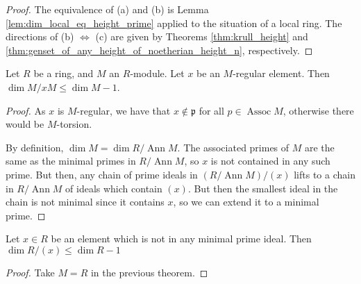 \begin{proof}
    The equivalence of (a) and (b) is
    Lemma \ref{lem:dim_local_eq_height_prime}
    applied to the situation of a local ring.
    The directions of (b) \(\iff\) (c) are given
    by Theorems \ref{thm:krull_height} and
    \ref{thm:genset_of_any_height_of_noetherian_height_n},
    respectively.
\end{proof}


%

\newcommand{\Assoc}{\operatorname{Assoc}}
\newcommand{\Ann}{\operatorname{Ann}}

\begin{theorem}
    \label{thm:quotient_regular_sub_dim_1}
    Let \(R\) be a ring, and \(M\) an \(R\)-module.
    Let \(x\) be an \(M\)-regular element.
    Then \(\dim M / xM \leq \dim M - 1\).
\end{theorem}

\begin{proof}
    As \(x\) is \(M\)-regular, we have that
    \(x \notin \mathfrak{p}\) for all
    \(p \in  \Assoc M\),
    otherwise there would be \(M\)-torsion.
    
    By definition, \(\dim M = \dim R / \Ann M\).
    The associated primes of \(M\) are the same
    as the minimal primes in \(R / \Ann M\),
    so \(x\) is not contained in any such prime.
    But then, any chain of prime ideals in 
    \((R / \Ann M) / (x)\) lifts to a chain in
    \(R / \Ann M\) of ideals which contain \((x)\).
    But then the smallest ideal in the chain 
    is not minimal since it contains \(x\), so
    we can extend it to a minimal prime.
\end{proof}

\begin{corollary}
  \label{cor:quotient_non_minimal_sub_dim_1}
  Let $x \in R$ be an element which is not in any 
  minimal prime ideal.
  Then $\dim R / (x) \leq \dim R - 1$
\end{corollary}

\begin{proof}

  Take $M = R$ in the previous theorem.
\end{proof}



